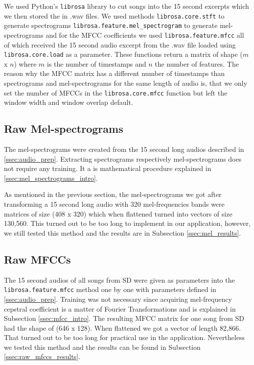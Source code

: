 We used Python's \texttt{librosa} library \cite{brian_mcfee_2019_2564164} to cut songs into the 15 second excerpts which we then stored the in .wav files. We used methods \texttt{librosa.core.stft} to generate spectrograms \texttt{librosa.feature.mel\_spectrogram} to generate mel-spectrograms and for the MFCC coefficients we used \texttt{librosa.feature.mfcc} all of which received the 15 second audio excerpt from the .wav file loaded using \texttt{librosa.core.load} as a parameter. These functions return a matrix of shape ($m$ x $n$) where $m$ is the number of timestamps and $n$ the number of features. The reason why the MFCC matrix has a different number of timestamps than spectrograms and mel-spectrograms for the same length of audio is, that we only set the number of MFCCs in the \texttt{librosa.core.mfcc} function but left the window width and window overlap default.

\subsection{Raw Mel-spectrograms}\label{ssec:raw_mels_experiments}
The mel-spectrograms were created from the 15 second long audios described in \ref{ssec:audio_prep}. Extracting spectrograms respectively mel-spectrograms does not require any training. It a is mathematical procedure explained in \ref{ssec:mel_spectrograms_intro}. 

As mentioned in the previous section, the mel-spectrograms we got after transforming a 15 second long audio with 320 mel-frequencies bands were matrices of size (408 x 320) which when flattened turned into vectors of size 130,560. This turned out to be too long to implement in our application, however, we still tested this method and the results are in Subsection \ref{ssec:mel_results}. 

\subsection{Raw MFCCs}\label{ssec:raw_mfccs_experiments}
The 15 second audios of all songs from SD were given as parameters into the \texttt{librosa.feature.mfcc} method one by one with parameters defined in \ref{ssec:audio_prep}. Training was not necessary since acquiring mel-frequency cepstral coefficient is a matter of Fourier Transformations and is explained in Subsection  \ref{ssec:mfcc_intro}. The resulting MFCC matrix for one song from SD had the shape of (646 x 128). When flattened we got a vector of length 82,866. That turned out to be too long for practical use in the application. Nevertheless we tested this method and the results can be found in Subsection \ref{ssec:raw_mfccs_results}.

